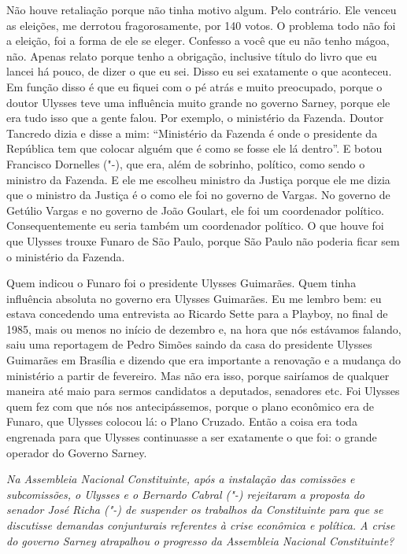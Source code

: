 Não houve retaliação porque não tinha motivo algum. Pelo
contrário. Ele venceu as eleições, me derrotou fragorosamente, por 140
votos. O problema todo não foi a eleição, foi a forma de ele se eleger.
Confesso a você que eu não tenho mágoa, não. Apenas relato porque tenho
a obrigação, inclusive título do livro que eu lancei há pouco, de dizer
o que eu sei. Disso eu sei exatamente o que aconteceu. Em função disso é
que eu fiquei com o pé atrás e muito preocupado, porque o doutor Ulysses
teve uma influência muito grande no governo Sarney, porque ele era tudo
isso que a gente falou. Por exemplo, o ministério da Fazenda. Doutor
Tancredo dizia e disse a mim: ``Ministério da Fazenda é onde o
presidente da República tem que colocar alguém que é como se fosse ele
lá dentro''. E botou Francisco Dornelles ("-), que era, além de
sobrinho, político, como sendo o ministro da Fazenda. E ele me escolheu
ministro da Justiça porque ele me dizia que o ministro da Justiça é o
como ele foi no governo de Vargas. No governo de Getúlio Vargas e no
governo de João Goulart, ele foi um coordenador político.
Consequentemente eu seria também um coordenador político. O que houve
foi que Ulysses trouxe Funaro de São Paulo, porque São Paulo não poderia
ficar sem o ministério da Fazenda.

Quem indicou o Funaro foi o presidente Ulysses Guimarães. Quem tinha
influência absoluta no governo era Ulysses Guimarães. Eu me lembro bem:
eu estava concedendo uma entrevista ao Ricardo Sette para a Playboy, no
final de 1985, mais ou menos no início de dezembro e, na hora que nós
estávamos falando, saiu uma reportagem de Pedro Simões saindo da casa do
presidente Ulysses Guimarães em Brasília e dizendo que era importante a
renovação e a mudança do ministério a partir de fevereiro. Mas não era
isso, porque sairíamos de qualquer maneira até maio para sermos
candidatos a deputados, senadores etc. Foi Ulysses quem fez com que nós
nos antecipássemos, porque o plano econômico era de Funaro, que Ulysses
colocou lá: o Plano Cruzado. Então a coisa era toda engrenada para que
Ulysses continuasse a ser exatamente o que foi: o grande operador do
Governo Sarney.

\medskip

\emph{Na Assembleia Nacional Constituinte, após a instalação das
comissões e subcomissões, o Ulysses e o Bernardo Cabral ("-)
rejeitaram a proposta do senador José Richa ("-) de suspender os
trabalhos da Constituinte para que se discutisse demandas conjunturais
referentes à crise econômica e política. A crise do governo Sarney
atrapalhou o progresso da Assembleia Nacional Constituinte?}

